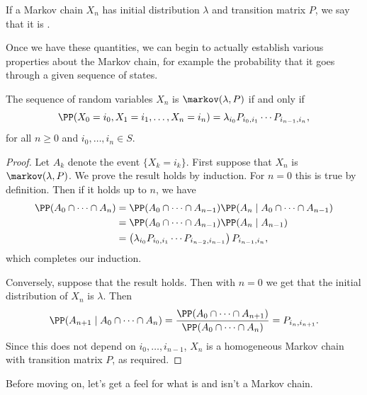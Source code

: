 \documentclass[a4paper]{scrartcl}
\begin{document}
If a Markov chain $X_n$ has initial distribution $\lambda$ and transition matrix $P$, we say that it is .

Once we have these quantities, we can begin to actually establish various properties about the Markov chain, for example the probability that it goes through a given sequence of states.

\begin{theorem}
	The sequence of random variables $X_n$ is $\markov(\lambda, P)$ if and only if
	$$
	\PP(X_0 = i_0, X_1 = i_1, \dots, X_n = i_n) = \lambda_{i_0}P_{i_0, i_1} \cdots P_{i_{n - 1}, i_n},
	$$
	for all $n \geq 0$ and $i_0, \dots, i_n \in S$.
\end{theorem}
\begin{proof}
	Let $A_k$ denote the event $\{X_k = i_k\}$. First suppose that $X_n$ is $\markov(\lambda, P)$. We prove the result holds by induction. For $n = 0$ this is true by definition. Then if it holds up to $n$, we have
	\begin{align*}
	\PP(A_0 \cap \cdots \cap A_n)  &= \PP(A_0 \cap \cdots \cap A_{n - 1})\PP(A_n \mid A_0 \cap \cdots \cap A_{n - 1}) \\
	&= \PP(A_0 \cap \cdots \cap A_{n - 1})\PP(A_n \mid A_{n - 1}) \\ 
	&= \left(\lambda_{i_0}P_{i_0, i_1} \cdots P_{i_{n - 2}, i_{n - 1}}\right)P_{i_{n - 1}, i_n},
\end{align*}
which completes our induction.

Conversely, suppose that the result holds. Then with $n = 0$ we get that the initial distribution of $X_n$ is $\lambda$. Then
$$
\PP(A_{n + 1} \mid A_{0} \cap \cdots \cap A_n) = \frac{\PP(A_0 \cap \cdots \cap A_{n + 1})}{\PP(A_0 \cap \cdots \cap A_{n})} = P_{i_{n}, i_{n + 1}}.
$$
Since this does not depend on $i_0, \dots, i_{n - 1}$, $X_n$ is a homogeneous Markov chain with transition matrix $P$, as required.
\end{proof}

Before moving on, let's get a feel for what is and isn't a Markov chain.
\end{document}

